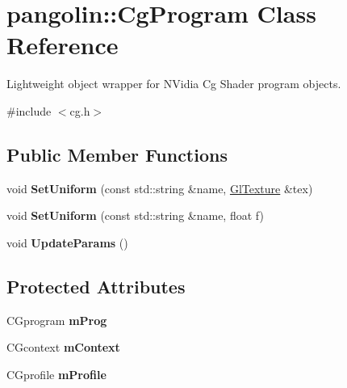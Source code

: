 \hypertarget{classpangolin_1_1_cg_program}{}\section{pangolin\+:\+:Cg\+Program Class Reference}
\label{classpangolin_1_1_cg_program}


Lightweight object wrapper for N\+Vidia Cg Shader program objects.  




{\ttfamily \#include $<$cg.\+h$>$}

\subsection*{Public Member Functions}
\begin{DoxyCompactItemize}
\item 
void {\bfseries Set\+Uniform} (const std\+::string \&name, \hyperlink{classpangolin_1_1_gl_texture}{Gl\+Texture} \&tex)\hypertarget{classpangolin_1_1_cg_program_a4670a3f84702d074e44b4aecf5ab3cbe}{}\label{classpangolin_1_1_cg_program_a4670a3f84702d074e44b4aecf5ab3cbe}

\item 
void {\bfseries Set\+Uniform} (const std\+::string \&name, float f)\hypertarget{classpangolin_1_1_cg_program_a9dee495f42bafdddd49869f9b43203d2}{}\label{classpangolin_1_1_cg_program_a9dee495f42bafdddd49869f9b43203d2}

\item 
void {\bfseries Update\+Params} ()\hypertarget{classpangolin_1_1_cg_program_ae35a6b434a00f7fc6238e0b0ff6fcc59}{}\label{classpangolin_1_1_cg_program_ae35a6b434a00f7fc6238e0b0ff6fcc59}

\end{DoxyCompactItemize}
\subsection*{Protected Attributes}
\begin{DoxyCompactItemize}
\item 
C\+Gprogram {\bfseries m\+Prog}\hypertarget{classpangolin_1_1_cg_program_a2f690aaf6587a6f4dd535e68ce8f3f0d}{}\label{classpangolin_1_1_cg_program_a2f690aaf6587a6f4dd535e68ce8f3f0d}

\item 
C\+Gcontext {\bfseries m\+Context}\hypertarget{classpangolin_1_1_cg_program_aa315f89e845a24116459e5a2ac8de699}{}\label{classpangolin_1_1_cg_program_aa315f89e845a24116459e5a2ac8de699}

\item 
C\+Gprofile {\bfseries m\+Profile}\hypertarget{classpangolin_1_1_cg_program_ab580ae58de5ad803da1e5b6e6d0e8dd2}{}\label{classpangolin_1_1_cg_program_ab580ae58de5ad803da1e5b6e6d0e8dd2}

\end{DoxyCompactItemize}
